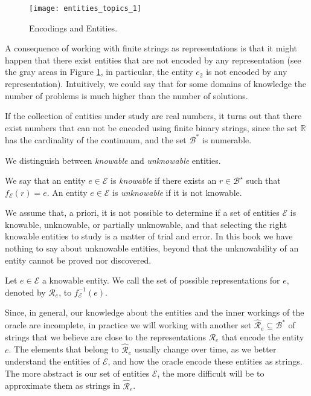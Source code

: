 \begin{figure}[h]
\centering\texttt{[image: entities\_topics\_1]}
\caption{\label{fig:entities_topics_1}Encodings and Entities.}
\end{figure}

A consequence of working with finite strings as representations is that it might happen that there exist entities that are not encoded by any representation (see the gray areas in Figure \ref{fig:entities_topics_1}, in particular, the entity $e_2$ is not encoded by any representation). Intuitively, we could say that for some domains of knowledge the number of problems is much higher than the number of solutions.

\begin{example}
If the collection of entities under study are real numbers, it turns out that there exist numbers that can not be encoded using finite binary strings, since the set $\mathbb{R}$ has the cardinality of the continuum, and the set $\mathcal{B}^\ast$ is numerable.
\end{example}

We distinguish between \emph{knowable} and \emph{unknowable} entities.

\begin{definition}
We say that an entity $e \in \mathcal{E}$ is \emph{knowable} if there exists an $r \in \mathcal{B}^\star$ such that $f_\mathcal{E}(r) = e$. An entity $e \in \mathcal{E}$ is \emph{unknowable} if it is not knowable.
\end{definition}

We assume that, a priori, it is not possible to determine if a set of entities $\mathcal{E}$ is knowable, unknowable, or partially unknowable, and that selecting the right knowable entities to study is a matter of trial and error. In this book  we have nothing to say about unknowable entities, beyond that the unknowability of an entity cannot be proved nor discovered.

\begin{definition}
Let $e \in \mathcal{E}$ a knowable entity. We call the set of possible representations for $e$, denoted by $\mathcal{R}_e$, to $f_\mathcal{E}^{-1} (e)$.
\end{definition}

Since, in general, our knowledge about the entities and the inner workings of the oracle are incomplete, in practice we will working with another set $\hat{\mathcal{R}}_e \subseteq \mathcal{B}^\ast$ of strings that we believe are close to the representations $\mathcal{R}_e$ that encode the entity $e$. The elements that belong to $\hat{\mathcal{R}}_e$ usually change over time, as we better understand the entities of $\mathcal{E}$, and how the oracle encode these entities as strings. The more abstract is our set of entities $\mathcal{E}$, the more difficult will be to approximate them as strings in $\hat{\mathcal{R}}_e$.


